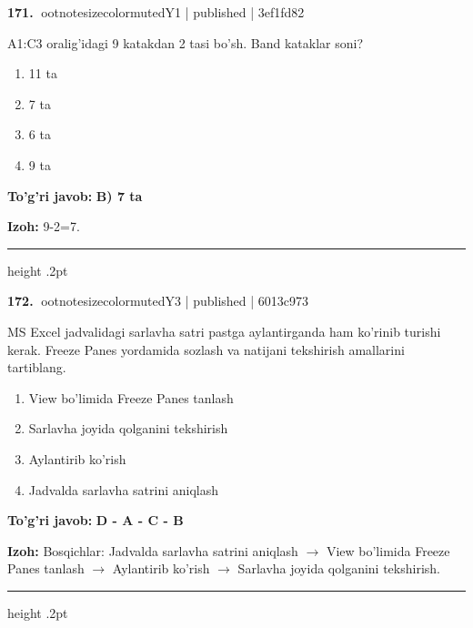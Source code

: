 \documentclass[10pt,a4paper]{article}
\begin{document}
\textbf{\color{ink}171.} {ootnotesizecolor{muted}Y1 | published | 3ef1fd82}
\par
A1:C3 oralig'idagi 9 katakdan 2 tasi bo'sh. Band kataklar soni?
\begin{enumerate}[label=\Alph*),leftmargin=9mm]
\item 11 ta
\item 7 ta
\item 6 ta
\item 9 ta
\end{enumerate}
\begin{tcolorbox}[enhanced,breakable,colback=teal!4,colframe=teal!55!black,boxrule=0.45pt,arc=1.2mm,left=2.8mm,right=2.8mm,top=2mm,bottom=2mm]
\textbf{\color{teal}To'g'ri javob:} \textbf{B) 7 ta}
\par\smallskip
\textbf{Izoh:} 9-2=7.
\end{tcolorbox}
\vspace{2mm}\hrule height .2pt\vspace{2mm}

\textbf{\color{ink}172.} {ootnotesizecolor{muted}Y3 | published | 6013c973}
\par
MS Excel jadvalidagi sarlavha satri pastga aylantirganda ham ko'rinib turishi kerak. Freeze Panes yordamida sozlash va natijani tekshirish amallarini tartiblang.
\begin{enumerate}[label=\Alph*),leftmargin=9mm]
\item View bo'limida Freeze Panes tanlash
\item Sarlavha joyida qolganini tekshirish
\item Aylantirib ko'rish
\item Jadvalda sarlavha satrini aniqlash
\end{enumerate}
\begin{tcolorbox}[enhanced,breakable,colback=teal!4,colframe=teal!55!black,boxrule=0.45pt,arc=1.2mm,left=2.8mm,right=2.8mm,top=2mm,bottom=2mm]
\textbf{\color{teal}To'g'ri javob:} \textbf{D - A - C - B}
\par\smallskip
\textbf{Izoh:} Bosqichlar: Jadvalda sarlavha satrini aniqlash \ensuremath{\rightarrow} View bo'limida Freeze Panes tanlash \ensuremath{\rightarrow} Aylantirib ko'rish \ensuremath{\rightarrow} Sarlavha joyida qolganini tekshirish.
\end{tcolorbox}
\vspace{2mm}\hrule height .2pt\vspace{2mm}
\end{document}
